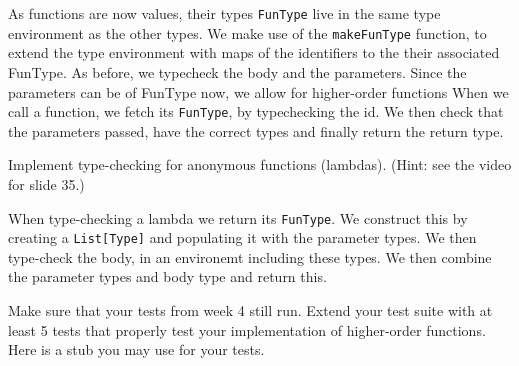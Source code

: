 \documentclass[working, oneside]{../../../Preambles/tuftebook}
\begin{document}
\begin{solution}
As functions are now values, their types \texttt{FunType} live in the same type environment as the other types. We make use of the \texttt{makeFunType} function, to extend the type environment with maps of the identifiers to the their associated FunType. As before, we typecheck the body and the parameters. Since the parameters can be of FunType now, we allow for higher-order functions
When we call a function, we fetch its \texttt{FunType}, by typechecking the id. We then check that the parameters passed, have the correct types and finally return the return type.
\end{solution}
\begin{exercise}[68 - b]
Implement type-checking for anonymous functions (lambdas). (Hint: see the video for slide 35.)
\end{exercise}
When type-checking a lambda we return its \texttt{FunType}. We construct this by creating a \texttt{List[Type]} and populating it with the parameter types. We then type-check the body, in an environemt including these types. We then combine the parameter types and body type and return this. 
\begin{exercise}[68 - d]
Make sure that your tests from week 4 still run. Extend your test suite with at least 5 tests that properly test your implementation of higher-order functions. Here is a stub you may use for your tests.
\end{exercise}
\end{document}
